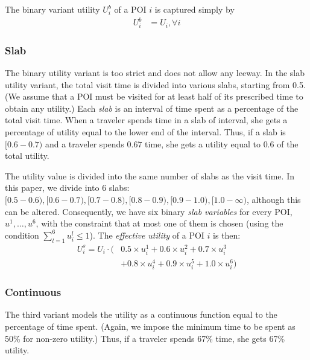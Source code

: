 The binary variant utility $U^b_i$ of a POI $i$ is captured simply by
%
\begin{align}
	\label{eq:binary}
	U^b_i & = U_i, \forall i
\end{align}

\subsubsection{\textbf{Slab}}
\label{sec:slab}

The binary utility variant is too strict and does not allow any leeway.
In the slab utility variant, the total visit time is divided into various slabs, starting from
0.5.  (We assume that a POI must be visited for at least half of its prescribed time
to obtain any utility.) Each \emph{slab} is an interval of time spent as a percentage
of the total visit time.  When a traveler spends time in a slab of
interval, she gets a percentage of utility equal to the lower end of the
interval.  Thus, if a slab is $[0.6-0.7)$ and a traveler spends $0.67$ time,
she gets a utility equal to $0.6$ of the total utility.

The utility value is divided into the same number of slabs as the visit
time.  In this paper, we divide into 6 slabs: $[0.5-0.6), [0.6-0.7), [0.7-0.8),
[0.8-0.9), [0.9-1.0), [1.0-\infty)$, although this can be altered.
Consequently, we have six binary \emph{slab variables} for every POI,
$u^1, \dots, u^6$, with the constraint that at most one of them is chosen
(using the condition $\sum_{l=1}^6 u^l_i \leq 1$).  The \emph{effective
utility} of a POI $i$ is then:
%
\begin{align}
	\label{eq:slab}
	U^s_i = U_i \cdot ( & 0.5 \times u^1_i + 0.6 \times u^2_i + 0.7 \times u^3_i \nonumber \\
		& + 0.8 \times u^4_i + 0.9 \times u^5_i + 1.0 \times u^6_i )
\end{align}

\subsubsection{\textbf{Continuous}}
\label{sec:continuous}

The third variant models the utility as a continuous function equal to the
percentage of time spent.  (Again, we impose the minimum time to be spent
as 50\% for non-zero utility.) Thus, if a traveler spends 67\% time, she
gets 67\% utility.

